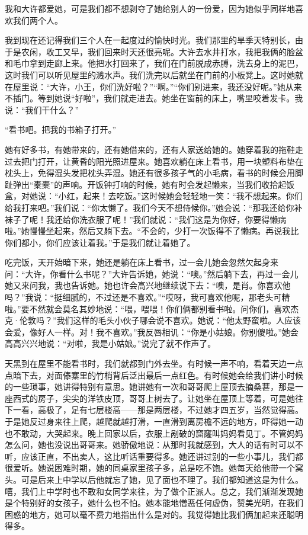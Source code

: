 我和大许都爱她，可是我们都不想剥夺了她给别人的一份爱，因为她似乎同样地喜欢我们两个人。 

我到现在还记得我们三个人在一起度过的愉快时光。我们那里的旱季天特别长，由于是农闲，收工又早，我们回来时天还很亮呢。大许去水井打水，我把我俩的脸盆和毛巾拿到走廊上来。他把水打回来了，我们在门前脱成赤膊，洗去身上的泥巴，这时我们可以听见屋里的溅水声。我们洗完以后就坐在门前的小板凳上。这时她就在屋里说：“大许，小王，你们洗好啦？”“啊。”“你们别进来，我还没好呢。”她从来不插门。等到她说“好啦”，我们就走进去。她坐在窗前的床上，嘴里咬着发卡。我说：“我们干什么？” 

“看书吧。把我的书箱子打开。” 

她有好多书，有她带来的，还有她借来的，还有人家送给她的。她穿着我的拖鞋走过去把门打开，让黄昏的阳光照进屋来。她喜欢躺在床上看书，用一块塑料布垫在枕头上，免得湿头发把枕头弄湿。她还有很多孩子气的小毛病，看书的时候会用脚趾弹出“橐橐”的声响。开饭钟打响的时候，她有时会发起懒来，当我们收拾起饭盒，对她说：“小红，起来！去吃饭。”这时候她会轻轻地一笑：“我不想起来。你们给我打来吧。”我们说：“你太懒了。我们今天不想侍候你。”她会说：“那我还给你补袜子了呢！我还给你洗衣服了呢！”我们就说：“我们这是为你好，你要得懒病啦。”她慢慢坐起来，然后又躺下去。“不会的，少打一次饭得不了懒病。再说我比你们都小，你们应该让着我。”于是我们就让着她了。 

吃完饭，天开始暗下来，她还是躺在床上看书，过一会儿她会忽然欠起身来问：“大许，你看什么书呢？”大许告诉她，她说：“噢。”然后躺下去，再过一会儿她又来问我，我也告诉她。她也许会高兴地继续说下去：“噢，是肖。你喜欢他吗？”我说：“挺细腻的，不过还是不喜欢。”“哎呀，我可喜欢他呢，那老头可精啦。”要不然就会莫名其妙地说：“喂，喂喂！你们俩都别看书啦。问你们，喜欢杰克·伦敦吗？”我们这样的毛头小伙子哪会说不喜欢。她说：“他太野蛮啦。人应该会爱，像好人一样。对！我不喜欢。”我反唇相讥：“你是小姑娘。你别傻啦。”她会高高兴兴地说：“对啦，我是小姑娘。”说完了就不作声了。 

天黑到在屋里不能看书时，我们就都到门外去坐。有时候一声不响，看着天边一点点暗下去，对面傣寨里的竹梢背后泛出最后一点红色。有时候她会给我们讲小时候的一些琐事，她讲得特别有意思。她讲她有一次和哥哥爬上屋顶去摘桑葚，那是一座西式的房子，尖尖的洋铁皮顶，哥哥上树去了。让她坐在屋顶上等着，可是她往下一看，高极了，足有七层楼高——那是两层楼，不过她才四五岁，当然觉得高。于是她反过身来往上爬，越爬就越打滑，一直滑到离房檐不远的地方，吓得她一动也不敢动，大哭起来。晚上回家以后，衣服上剐破的窟窿叫妈妈看见丁。不管妈妈怎么问，她也没说出哥哥来。她骄傲地说：从那时我就感到，大人的话有时可以不听，应该正直，不出卖人，这比听话重要得多。她还讲过别的一些小事儿，我们都很爱听。她说困难时期，她的同桌家里孩子多，总是吃不饱。她每天给他带一个窝头。可是后来上中学以后他就忘了她，见了面也不理了。我们都知道这是为什么。嘻，我们上中学时也不敢和女同学来往，为了做个正派人。总之，我们渐渐发现她是个特别好的女孩子，她什么也不怕。她本能地憎恶任何虚伪，赞美光明，在我们困惑的地方，她可以毫不费力地指出什么是对的。我觉得她比我们俩加起来还聪明得多。 

